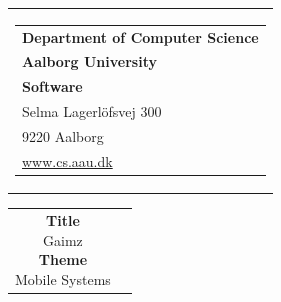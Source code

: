 


\thispagestyle{empty}

\begin{nopagebreak}
{
\samepage 
\begin{tabular}{r}
\parbox{\textwidth}
{
    \hfill \parbox{7.9cm}
    {
        \begin{tabular}{l}
            {\sf\small \textbf{Department of Computer Science}}\\
            {\sf\small \textbf{Aalborg University}}\\
            {\sf\small \textbf{Software}} \\
            {\sf\small Selma Lagerl\"{o}fsvej 300} \\
            {\sf\small 9220{  }Aalborg} \\
            {\sf\small \url{www.cs.aau.dk}}
        \end{tabular}
    }
}
\\
\end{tabular}

\begin{tabular}{cc}

    \parbox{6.5cm}
    {
        \textbf{Title} \\
        Gaimz \\

        \textbf{Theme} \\ 
        Mobile Systems \\

}
\end{tabular}}
\end{nopagebreak}
